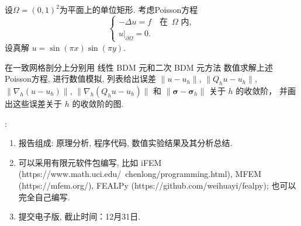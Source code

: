 
设$\Omega=(0,1)^2$为平面上的单位矩形. 考虑Poisson方程
$$
\begin{cases}
-\Delta u=f\quad  \textrm{在 }\, \Omega \textrm{ 内},\\
u|_{\partial \Omega}=0.
\end{cases}
$$
设真解 $u=\sin(\pi x)\sin(\pi y)$.

在一致网格剖分上分别用
线性 BDM 元和二次 BDM 元方法
数值求解上述Poisson方程, 进行数值模拟, 列表给出误差 $\|u-u_h\|$, $\|Q_hu-u_h\|$, $\|\nabla_h(u-u_h)\|$, $\|\nabla_h(Q_hu-u_h)\|$ 和 $\|\boldsymbol{\sigma}-\boldsymbol{\sigma}_h\|$ 关于 $h$ 的收敛阶，
并画出这些误差关于 $h$ 的收敛阶的图.

\vskip1cm
: 

\begin{enumerate}[(1)]
\item 报告组成: 原理分析, 程序代码, 数值实验结果及其分析总结.
\item 可以采用有限元软件包编写, 比如 iFEM (https://www.math.uci.edu/~chenlong/programming.html), MFEM (https://mfem.org/), FEALPy (https://github.com/weihuayi/fealpy); 也可以完全自己编写.

\item 提交电子版, 截止时间：12月31日.
\end{enumerate}



%
